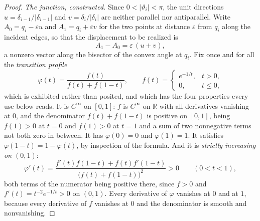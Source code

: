 \begin{proof}
\emph{The junction, constructed.} Since $0<|\vartheta_i|<\pi$, the unit directions
$u=\delta_{i-1}/|\delta_{i-1}|$ and $v=\delta_i/|\delta_i|$ are neither parallel
nor antiparallel. Write $A_0=q_i-\varepsilon u$ and $A_1=q_i+\varepsilon v$ for
the two points at distance $\varepsilon$ from $q_i$ along the incident edges, so
that the displacement to be realized is
\[
   A_1-A_0=\varepsilon\,(u+v),
\]
a nonzero vector along the bisector of the convex angle at $q_i$. Fix once and
for all the \emph{transition profile}
\[
   \varphi(t)=\frac{f(t)}{f(t)+f(1-t)},
   \qquad
   f(t)=\begin{cases} e^{-1/t}, & t>0,\\ 0,& t\leq0,\end{cases}
\]
which is exhibited rather than posited, and which has the four properties every
use below reads. It is $C^\infty$ on $[0,1]$: $f$ is $C^\infty$ on $\mathbb R$
with all derivatives vanishing at $0$, and the denominator
$f(t)+f(1-t)$ is positive on $[0,1]$, being $f(1)>0$ at $t=0$ and $f(1)>0$ at
$t=1$ and a sum of two nonnegative terms not both zero in between. It has
$\varphi(0)=0$ and $\varphi(1)=1$. It satisfies $\varphi(1-t)=1-\varphi(t)$, by
inspection of the formula. And it is \emph{strictly increasing on $(0,1)$}:
\[
   \varphi'(t)=\frac{f'(t)f(1-t)+f(t)f'(1-t)}{\bigl(f(t)+f(1-t)\bigr)^2}>0
   \qquad (0<t<1),
\]
both terms of the numerator being positive there, since $f>0$ and
$f'(t)=t^{-2}e^{-1/t}>0$ on $(0,1)$. Every derivative of $\varphi$ vanishes at
$0$ and at $1$, because every derivative of $f$ vanishes at $0$ and the
denominator is smooth and nonvanishing.


\end{proof}
